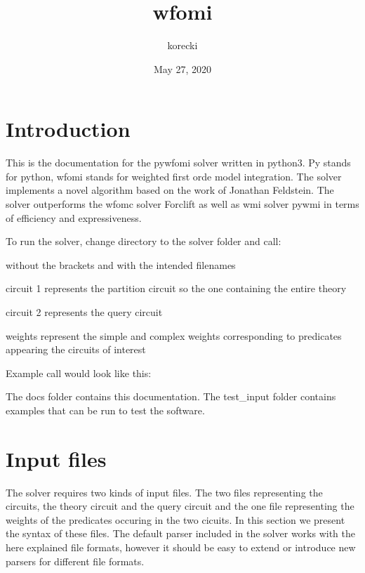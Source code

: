 \documentclass[letterpaper,10pt,english,openany,oneside]{sphinxmanual}
\title{wfomi}
\date{May 27, 2020}
\author{korecki}
\begin{document}
\pagestyle{empty}
\sphinxmaketitle
\pagestyle{plain}
\sphinxtableofcontents
\pagestyle{normal}
\label{\detokenize{index::doc}}



\chapter{Introduction}
\label{\detokenize{index:introduction}}
This is the documentation for the pywfomi solver written in python3.
Py stands for python, wfomi stands for weighted first orde model integration.
The solver implements a novel algorithm based on the work of Jonathan Feldstein.
The solver outperforms the wfomc solver \sphinxhyphen{} Forclift as well as wmi solver \sphinxhyphen{} pywmi in terms of efficiency and expressiveness.

To run the solver, change directory to the solver folder and call:

\begin{sphinxVerbatim}[commandchars=\\\{\}]
\end{sphinxVerbatim}

without the brackets and with the intended filenames

\begin{DUlineblock}{0em}
\item[] circuit 1 represents the partition circuit so the one containing the entire theory
\item[] circuit 2 represents the query circuit
\item[] weights represent the simple and complex weights corresponding to predicates appearing the circuits of interest
\end{DUlineblock}

Example call would look like this:

\begin{sphinxVerbatim}[commandchars=\\\{\}]
\end{sphinxVerbatim}

The docs folder contains this documentation.
The test\_input folder contains examples that can be run to test the software.


\chapter{Input files}
\label{\detokenize{index:input-files}}
The solver requires two kinds of input files.
The two files representing the circuits, the theory circuit and the query circuit and the one file representing the weights of the predicates occuring in the two cicuits. In this section we present the syntax of these files. The default parser included in the solver works with the here explained file formats, however it should be easy to extend or introduce new parsers for different file formats.
\end{document}
